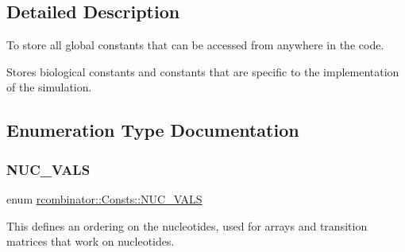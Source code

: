 \subsection{Detailed Description}
To store all global constants that can be accessed from anywhere in the code. 

Stores biological constants and constants that are specific to the implementation of the simulation. 

\subsection{Enumeration Type Documentation}
\mbox{\label{namespacercombinator_1_1Consts_aaa096a23d1bc2fdb1992265192fae907}} 
\subsubsection{\texorpdfstring{N\+U\+C\+\_\+\+V\+A\+LS}{NUC\_VALS}}
{\footnotesize\ttfamily enum \mbox{\hyperlink{namespacercombinator_1_1Consts_aaa096a23d1bc2fdb1992265192fae907}{rcombinator\+::\+Consts\+::\+N\+U\+C\+\_\+\+V\+A\+LS}}}



This defines an ordering on the nucleotides, used for arrays and transition matrices that work on nucleotides. 

